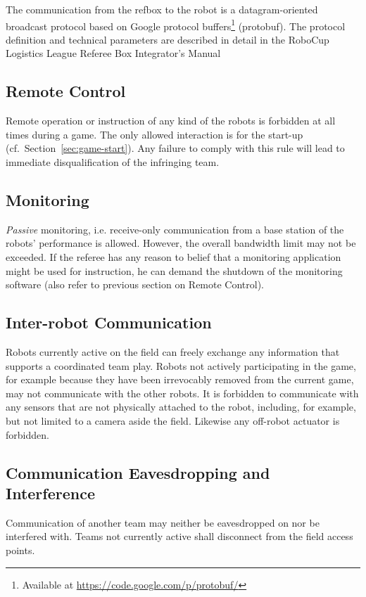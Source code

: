 \documentclass[12pt,twoside]{article}
\newcommand{\refsec}[1]{Section~\ref{#1}}
\begin{document}
The communication from the refbox to the robot is a datagram-oriented
broadcast protocol based on Google protocol buffers\footnote{Available
  at \url{https://code.google.com/p/protobuf/}} (protobuf). The
protocol definition and technical parameters are described in detail
in the RoboCup Logistics League Referee Box Integrator's
Manual~\cite{RefBoxIntManual}

\subsection{Remote Control}
\label{sec:remote-control}
Remote operation or instruction of any kind of the robots is forbidden
at all times during a game. The only allowed interaction is for the
start-up (cf.~\refsec{sec:game-start}). Any failure to comply with
this rule will lead to immediate disqualification of the infringing
team.

\subsection{Monitoring}
\label{sec:monitoring}
\emph{Passive} monitoring, i.e. receive-only communication from a base
station of the robots' performance is allowed. However, the overall
bandwidth limit may not be exceeded.
If the referee has any reason to belief that a monitoring application
might be used for instruction, he can demand the shutdown of the
monitoring software (also refer to previous section on Remote
Control).

\subsection{Inter-robot Communication}
\label{sec:inter-robot-comm}
Robots currently active on the field can freely exchange any
information that supports a coordinated team play. Robots not actively
participating in the game, for example because they have been
irrevocably removed from the current game, may not communicate with
the other robots. It is forbidden to communicate with any sensors that
are not physically attached to the robot, including, for example, but
not limited to a camera aside the field. Likewise any off-robot
actuator is forbidden.

\subsection{Communication Eavesdropping and Interference}
\label{sec:comm-tampering}
Communication of another team may neither be eavesdropped on nor be
interfered with. Teams not currently active shall disconnect from the
field access points.
\end{document}
